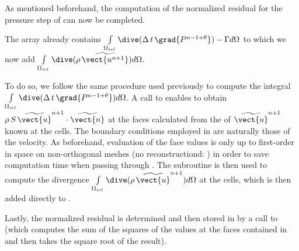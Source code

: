 
As mentioned beforehand, the computation of the normalized residual for the pressure step of  can now be completed.

The  array already contains
$\int\limits_{\Omega_{iel}}{\dive(\Delta\,t\,\grad{P^{n-1+\theta}}) -\Gamma d\Omega}$ to which we now add
$\int\limits_{\Omega_{iel}}{\dive(\rho\,\widetilde{\vect{u^{n+1}}})d\Omega}$.

To do so, we follow the same procedure used previously to compute the integral
$\int\limits_{\Omega_{iel}}{\dive(\Delta\,t\,\grad{P^{n-1+\theta}}) d\Omega}$. A call to
 enables to obtain
$\rho\,S\,\widetilde{\vect{u}}^{n+1}\cdot\widetilde{\vect{n}}$ at the faces calculated from the of
$\widetilde{\vect{u}}^{n+1}$ known at the cells. The boundary conditions
employed in  are naturally those of the velocity. As beforehand, evaluation of the face values is only up to first-order in space on non-orthogonal meshes (no reconstructiond: ) in order to save computation time when passing through . The subroutine  is then used to compute the divergence $\int\limits_{\Omega_{iel}}{\dive(\rho\,\widetilde{\vect{u}}^{n+1})d\Omega}$ at the cells, which is then added directly to .

Lastly, the normalized residual is determined and then stored in  by a call to   (which computes the sum of the squares of the values at the faces contained in  and then takes the square root of the result).\\


\newpage

